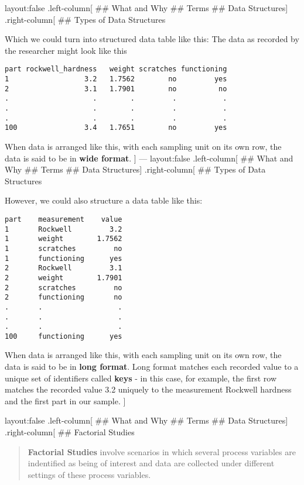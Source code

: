 \documentclass[]{article}
\begin{document}
layout:false .left-column{[} \#\# What and Why \#\# Terms \#\# Data
Structures{]} .right-column{[} \#\# Types of Data Structures

Which we could turn into structured data table like this: The data as
recorded by the researcher might look like this

\begin{verbatim}
part rockwell_hardness   weight scratches functioning
1                  3.2   1.7562        no         yes
2                  3.1   1.7901        no          no
.                    .        .         .           .
.                    .        .         .           .
.                    .        .         .           .
100                3.4   1.7651        no         yes
\end{verbatim}

When data is arranged like this, with each sampling unit on its own row,
the data is said to be in \textbf{wide format}. {]} --- layout:false
.left-column{[} \#\# What and Why \#\# Terms \#\# Data Structures{]}
.right-column{[} \#\# Types of Data Structures

However, we could also structure a data table like this:

\begin{verbatim}
part    measurement    value
1       Rockwell         3.2
1       weight        1.7562
1       scratches         no
1       functioning      yes
2       Rockwell         3.1
2       weight        1.7901
2       scratches         no
2       functioning       no
.       .                  .
.       .                  .
.       .                  .
100     functioning      yes
\end{verbatim}

When data is arranged like this, with each sampling unit on its own row,
the data is said to be in \textbf{long format}. Long format matches each
recorded value to a unique set of identifiers called \textbf{keys} - in
this case, for example, the first row matches the recorded value 3.2
uniquely to the measurement Rockwell hardness and the first part in our
sample. {]}

layout:false .left-column{[} \#\# What and Why \#\# Terms \#\# Data
Structures{]} .right-column{[} \#\# Factorial Studies

\begin{quote}
\textbf{Factorial Studies} involve scenarios in which several process
variables are indentified as being of interest and data are collected
under different settings of these process variables.
\end{quote}
\end{document}
